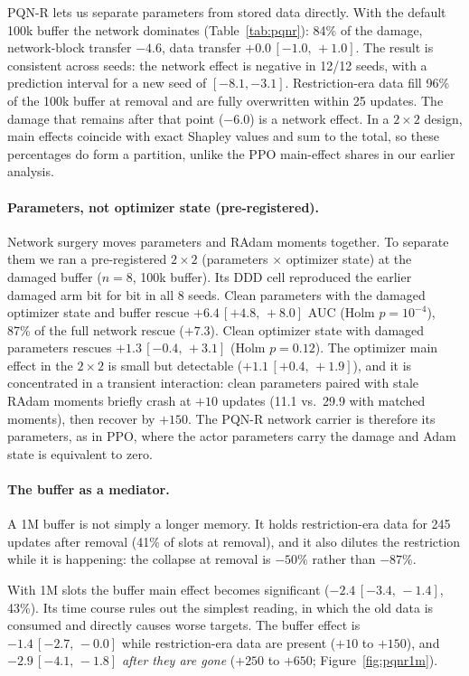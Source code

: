 \documentclass[10pt]{article} %
\newcommand{\ci}[2]{\,[#1,\,#2]}
\begin{document}
PQN-R lets us separate parameters from stored data directly. With the default 100k buffer the network dominates (Table~\ref{tab:pqnr}): 84\% of the damage, network-block transfer $-4.6$, data transfer $+0.0\ci{-1.0}{+1.0}$. The result is consistent across seeds: the network effect is negative in 12/12 seeds, with a prediction interval for a new seed of $[-8.1,-3.1]$. Restriction-era data fill 96\% of the 100k buffer at removal and are fully overwritten within 25 updates. The damage that remains after that point ($-6.0$) is a network effect. In a $2\times2$ design, main effects coincide with exact Shapley values and sum to the total, so these percentages do form a partition, unlike the PPO main-effect shares in our earlier analysis.

\paragraph{Parameters, not optimizer state (pre-registered).}
Network surgery moves parameters and RAdam moments together. To separate them we ran a pre-registered $2\times2$ (parameters $\times$ optimizer state) at the damaged buffer ($n=8$, 100k buffer). Its DDD cell reproduced the earlier damaged arm bit for bit in all 8 seeds. Clean parameters with the damaged optimizer state and buffer rescue $+6.4\ci{+4.8}{+8.0}$ AUC (Holm $p=10^{-4}$), 87\% of the full network rescue ($+7.3$). Clean optimizer state with damaged parameters rescues $+1.3\ci{-0.4}{+3.1}$ (Holm $p=0.12$). The optimizer main effect in the $2\times2$ is small but detectable ($+1.1\ci{+0.4}{+1.9}$), and it is concentrated in a transient interaction: clean parameters paired with stale RAdam moments briefly crash at $+10$ updates (11.1 vs.\ 29.9 with matched moments), then recover by $+150$. The PQN-R network carrier is therefore its parameters, as in PPO, where the actor parameters carry the damage and Adam state is equivalent to zero.

\paragraph{The buffer as a mediator.}
A 1M buffer is not simply a longer memory. It holds restriction-era data for 245 updates after removal (41\% of slots at removal), and it also dilutes the restriction while it is happening: the collapse at removal is $-50\%$ rather than $-87\%$.

With 1M slots the buffer main effect becomes significant ($-2.4\ci{-3.4}{-1.4}$, 43\%). Its time course rules out the simplest reading, in which the old data is consumed and directly causes worse targets. The buffer effect is $-1.4\ci{-2.7}{-0.0}$ while restriction-era data are present ($+10$ to $+150$), and $-2.9\ci{-4.1}{-1.8}$ \emph{after they are gone} ($+250$ to $+650$; Figure~\ref{fig:pqnr1m}).
\end{document}
